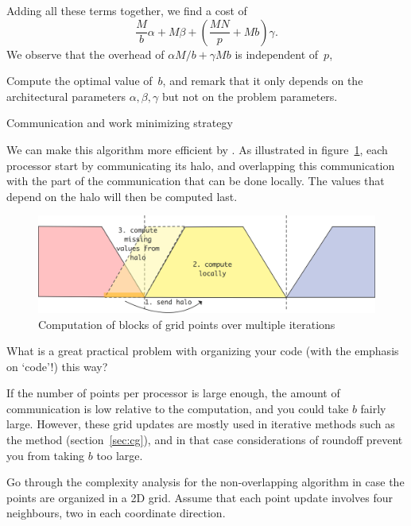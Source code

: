Adding all these terms together, we find a cost of
\[ \frac Mb\alpha+M\beta+\left(\frac {MN}p+Mb\right)\gamma. \]
We observe that the overhead of $\alpha M/b+\gamma Mb$ is independent of~$p$,
\begin{exercise}
  Compute the optimal value of~$b$, and remark that it only depends on
  the architectural parameters $\alpha,\beta,\gamma$ but not on the
  problem parameters.
\end{exercise}

 {Communication and work minimizing strategy}

We can make this algorithm more efficient by 
.
As illustrated in
figure~\ref{fig:grid-update-local}, each processor start by
communicating its halo, and overlapping this communication with the
part of the communication that can be done locally. The values that
depend on the halo will then be computed last.

\begin{figure}[ht]
\includegraphics[scale=.1]{graphics/grid-update-local}
\caption{Computation of blocks of grid points over multiple iterations}
\label{fig:grid-update-local}
\end{figure}

\begin{exercise}
  What is a great practical problem with organizing your code (with
  the emphasis on `code'!) this way?
\end{exercise}

If the number of points per processor is large enough, the amount of
communication is low relative to the computation, and you could take
$b$ fairly large. However, these grid updates are mostly used in
iterative methods such as the  method
(section~\ref{sec:cg}), and in that case considerations of roundoff
prevent you from taking $b$ too large\cite{ChGe:sstep}.

\begin{exercise}
  Go through the complexity analysis for the non-overlapping algorithm
  in case the points are organized in a 2D grid. Assume that each
  point update involves four neighbours, two in each coordinate
  direction.
\end{exercise}

